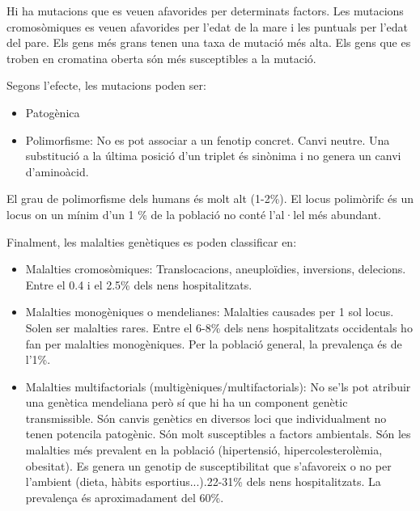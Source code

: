 Hi ha mutacions que es veuen afavorides per determinats factors. Les mutacions cromosòmiques es veuen afavorides per l'edat de la mare i les puntuals per l'edat del pare. Els gens més grans tenen una taxa de mutació més alta. Els gens que es troben en cromatina oberta són més susceptibles a la mutació.

Segons l'efecte, les mutacions poden ser:
\begin{itemize}
\item Patogènica
\item Polimorfisme: No es pot associar a un fenotip concret. Canvi neutre. Una substitució a la última posició d'un triplet és sinònima i no genera un canvi d'aminoàcid.
\end{itemize}

El grau de polimorfisme dels humans és molt alt (1-2\%). El locus polimòrifc és un locus on un mínim d'un 1 \% de la població no conté l'al·lel més abundant.

Finalment, les malalties genètiques es poden classificar en:
\begin{itemize}
\item Malalties cromosòmiques: Translocacions, aneuploïdies, inversions, delecions. Entre el 0.4 i el 2.5\% dels nens hospitalitzats.

\item Malalties monogèniques o mendelianes: Malalties causades per 1 sol locus. Solen ser malalties rares. Entre el 6-8\% dels nens hospitalitzats occidentals ho fan per malalties monogèniques. Per la població general, la prevalença és de l'1\%.

\item Malalties multifactorials (multigèniques/multifactorials): No se'ls pot atribuir una genètica mendeliana però sí que hi ha un component genètic transmissible. Són canvis genètics en diversos loci que individualment no tenen potencila patogènic. Són molt susceptibles a factors ambientals. Són les malalties més prevalent en la població (hipertensió, hipercolesterolèmia, obesitat). Es genera un genotip de susceptibilitat que s'afavoreix o no per l'ambient (dieta, hàbits esportius...).22-31\% dels nens hospitalitzats. La prevalença és aproximadament del 60\%.
\end{itemize}


